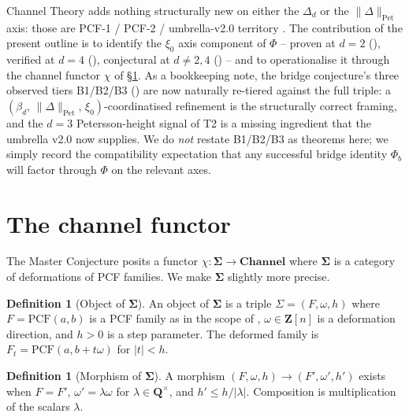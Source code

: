 \documentclass[11pt,reqno]{amsart}
\theoremstyle{plain}
\theoremstyle{definition}
\newtheorem{definition}[theorem]{Definition}
\theoremstyle{remark}
\newcommand{\Channel}{\mathbf{Channel}}
\newcommand{\Sigmaspace}{\mathbf{\Sigma}}
\newcommand{\PCF}{\mathrm{PCF}}
\begin{document}
Channel Theory adds nothing structurally new on either the
$\Delta_d$ or the $\|\Delta\|_{\mathrm{Pet}}$ axis: those
are PCF-1 / PCF-2 / umbrella-v2.0 territory
\cite{siarc_pcf1_v13, siarc_pcf2_v13, siarc_umbrella_v2}.
The contribution of the present outline is to identify the
$\xi_0$ axis component of $\Phi$ -- proven at $d=2$
(), verified at $d=4$ (),
conjectural at $d \ne 2,4$ () -- and
to operationalise it through the channel functor $\chi$ of
\S\ref{sec:functor}. As a bookkeeping note, the bridge
conjecture's three observed tiers B1/B2/B3
() are now naturally re-tiered against
the full triple: a
$(\beta_d,\,\|\Delta\|_{\mathrm{Pet}},\,\xi_0)$-coordinatised
refinement is the structurally correct framing, and the
$d=3$ Petersson-height signal of T2 is a missing
ingredient that the umbrella v2.0 now supplies. We do
\emph{not} restate B1/B2/B3 as theorems here; we simply
record the compatibility expectation that any successful
bridge identity $\Phi_b$ will factor through $\Phi$ on the
relevant axes.

\section{The channel functor}
\label{sec:functor}

The Master Conjecture \cite{siarc_umbrella_v2} posits a functor
$\chi : \Sigmaspace \to \Channel$ where $\Sigmaspace$ is a
category of deformations of PCF families. We make
$\Sigmaspace$ slightly more precise.

\begin{definition}[Object of $\Sigmaspace$]
An object of $\Sigmaspace$ is a triple
$\Sigma = (F, \omega, h)$ where $F = \PCF(a, b)$ is a PCF
family as in the scope of ,
$\omega \in \mathbf{Z}[n]$ is a deformation direction, and
$h > 0$ is a step parameter. The deformed family is
$F_t = \PCF(a, b + t \omega)$ for $|t| < h$.
\end{definition}

\begin{definition}[Morphism of $\Sigmaspace$]
A morphism
$(F, \omega, h) \to (F', \omega', h')$ exists when $F = F'$,
$\omega' = \lambda \omega$ for $\lambda \in \mathbf{Q}^\times$,
and $h' \le h / |\lambda|$. Composition is multiplication of
the scalars $\lambda$.
\end{definition}
\end{document}
